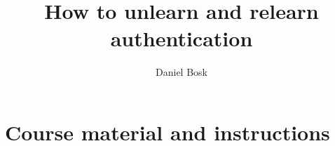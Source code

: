 \title{%
  How to unlearn and relearn authentication
}
\author{Daniel Bosk}

\begin{abstract}
  
\end{abstract}

\maketitle









\printbibliography

\appendix
\section{Course material and instructions}%
\label{course-material}


